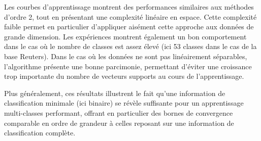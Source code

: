 \documentclass[preprint,12pt,authoryear]{elsarticle}
\begin{document}
Les courbes d'apprentissage montrent des performances similaires aux méthodes d'ordre 2, tout en présentant une complexité linéaire en espace. 
Cette complexité faible permet en particulier d'appliquer aisément cette approche aux données de grande dimension. Les expériences montrent également un bon comportement dans le cas où le nombre de classes est assez élevé (ici 53 classes dans le cas de la base Reuters).  
Dans le cas où les données ne sont pas linéairement séparables, l'algorithme présente une bonne parcimonie, permettant d'éviter une croissance trop importante du nombre de vecteurs supports au cours de l'apprentissage.

Plus généralement, ces résultats illustrent le fait qu'une information de classification minimale (ici binaire) se révèle suffisante pour un apprentissage multi-classes performant, offrant en particulier des bornes de convergence comparable en ordre de grandeur à celles reposant sur une information de classification complète.






\end{document}
